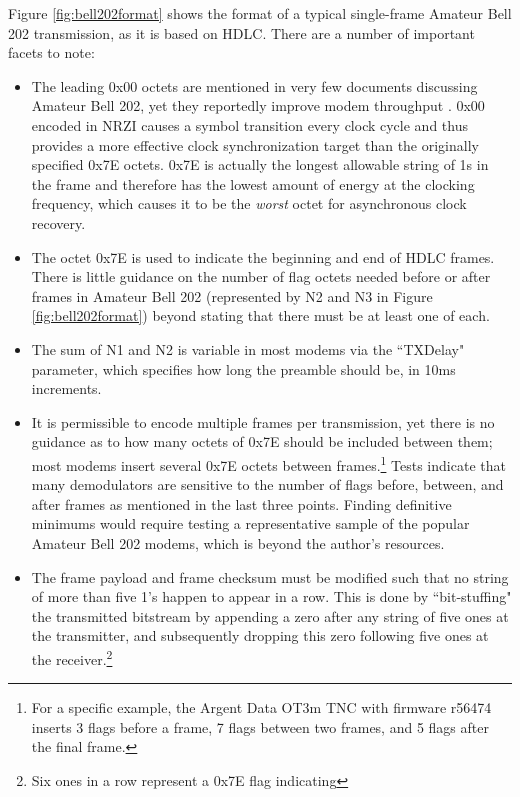Figure \ref{fig:bell202format} shows the format of a typical single-frame
Amateur Bell 202 transmission, as it is based on HDLC.
There are a number of important facets to note:
\begin{itemize}
	\item The leading 0x00 octets are mentioned in very few documents
		discussing Amateur Bell 202, yet they reportedly improve modem
		throughput \cite{millerinterview}\cite{aprsunveiled}. 
		0x00 encoded in NRZI causes a symbol transition
		every clock cycle and thus provides a more effective clock 
		synchronization target than the originally specified 0x7E octets. 
		0x7E is actually 
		the longest allowable string of 1s in the frame and 
		therefore has the lowest amount of energy at the clocking frequency,
		which causes it to be the \emph{worst} 
		octet for asynchronous clock recovery.
	\item The octet 0x7E is used to indicate the beginning and end of 
		HDLC frames.
		There is little guidance on the number of flag octets needed before
		or after frames in Amateur Bell 202 (represented by N2 and N3 in 
		Figure \ref{fig:bell202format})
		beyond stating that there must be at least one of each. 
	\item The sum of
		N1 and N2 is variable in most modems via the ``TXDelay" parameter,
		which specifies how long the preamble should be, in 10ms increments.
	\item It is permissible to encode multiple 
		frames per transmission, yet there is no guidance as to how
		many octets of 0x7E should be included between them;
		most modems insert several 0x7E octets between 
		frames.\footnote{For a specific example, the Argent Data OT3m TNC 
			with firmware r56474 inserts 3 flags before
		a frame, 7 flags between two frames, and 5 flags after the final frame.}
		Tests indicate that many demodulators are sensitive to the number of flags 
		before, between, and after frames as mentioned in the last three points.
		Finding definitive minimums would require testing a representative
		sample of the
		popular Amateur Bell 202 modems, which is beyond the author's resources.
	\item The frame payload and frame checksum must be modified such 
		that no string of more than five 1's happen to appear in a row.
		This is done by ``bit-stuffing" the transmitted bitstream by
		appending a zero after any string of five ones at the transmitter,
		and subsequently dropping this zero following five ones at the 
		receiver.\footnote{Six ones in a row represent a 0x7E flag indicating 
}
\end{itemize}
